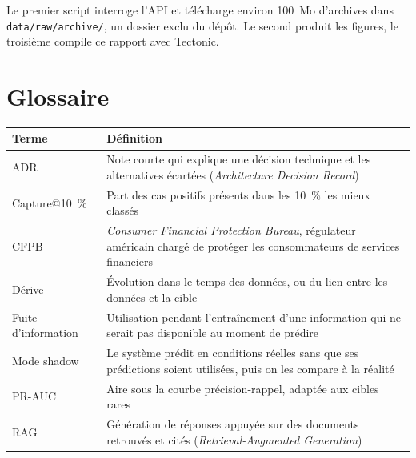 \documentclass[11pt,a4paper]{article}
\begin{document}
Le premier script interroge l'API et télécharge environ 100~Mo d'archives dans \nolinkurl{data/raw/archive/}, un dossier exclu du dépôt. Le second produit les figures, le troisième compile ce rapport avec Tectonic.

\section{Glossaire}

\begin{table}[H]
\centering\small
\begin{tabularx}{\linewidth}{@{}l Y@{}}
\toprule
Terme & Définition \\
\midrule
ADR & Note courte qui explique une décision technique et les alternatives écartées (\emph{Architecture Decision Record}) \\
Capture@10~\% & Part des cas positifs présents dans les 10~\% les mieux classés \\
CFPB & \emph{Consumer Financial Protection Bureau}, régulateur américain chargé de protéger les consommateurs de services financiers \\
Dérive & Évolution dans le temps des données, ou du lien entre les données et la cible \\
Fuite d'information & Utilisation pendant l'entraînement d'une information qui ne serait pas disponible au moment de prédire \\
Mode shadow & Le système prédit en conditions réelles sans que ses prédictions soient utilisées, puis on les compare à la réalité \\
PR-AUC & Aire sous la courbe précision-rappel, adaptée aux cibles rares \\
RAG & Génération de réponses appuyée sur des documents retrouvés et cités (\emph{Retrieval-Augmented Generation}) \\
\bottomrule
\end{tabularx}
\end{table}
\end{document}
